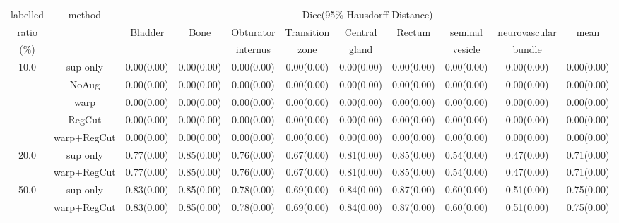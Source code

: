 \begin{table}%
\begin{tabular}{c|c|ccccccccc}%
\hline%
labelled&\multirow{3}{*}{method}&\multicolumn{9}{c}{Dice(95\% Hausdorff Distance)}\\%
ratio&&\multirow{2}{*}{Bladder}&\multirow{2}{*}{Bone}&Obturator&Transition&Central&\multirow{2}{*}{Rectum}&seminal&neurovascular&\multirow{2}{*}{mean}\\%
(\%)&&&&internus&zone&gland&&vesicle&bundle&\\%
\hline%
\multirow{5}{*}{10.0}&sup only&0.00(0.00)&0.00(0.00)&0.00(0.00)&0.00(0.00)&0.00(0.00)&0.00(0.00)&0.00(0.00)&0.00(0.00)&0.00(0.00)\\%
&NoAug&0.00(0.00)&0.00(0.00)&0.00(0.00)&0.00(0.00)&0.00(0.00)&0.00(0.00)&0.00(0.00)&0.00(0.00)&0.00(0.00)\\%
&warp&0.00(0.00)&0.00(0.00)&0.00(0.00)&0.00(0.00)&0.00(0.00)&0.00(0.00)&0.00(0.00)&0.00(0.00)&0.00(0.00)\\%
&RegCut&0.00(0.00)&0.00(0.00)&0.00(0.00)&0.00(0.00)&0.00(0.00)&0.00(0.00)&0.00(0.00)&0.00(0.00)&0.00(0.00)\\%
&warp+RegCut&0.00(0.00)&0.00(0.00)&0.00(0.00)&0.00(0.00)&0.00(0.00)&0.00(0.00)&0.00(0.00)&0.00(0.00)&0.00(0.00)\\%
\hline%
\multirow{2}{*}{20.0}&sup only&0.77(0.00)&0.85(0.00)&0.76(0.00)&0.67(0.00)&0.81(0.00)&0.85(0.00)&0.54(0.00)&0.47(0.00)&0.71(0.00)\\%
&warp+RegCut&0.77(0.00)&0.85(0.00)&0.76(0.00)&0.67(0.00)&0.81(0.00)&0.85(0.00)&0.54(0.00)&0.47(0.00)&0.71(0.00)\\%
\hline%
\multirow{2}{*}{50.0}&sup only&0.83(0.00)&0.85(0.00)&0.78(0.00)&0.69(0.00)&0.84(0.00)&0.87(0.00)&0.60(0.00)&0.51(0.00)&0.75(0.00)\\%
&warp+RegCut&0.83(0.00)&0.85(0.00)&0.78(0.00)&0.69(0.00)&0.84(0.00)&0.87(0.00)&0.60(0.00)&0.51(0.00)&0.75(0.00)\\%
\hline%
\end{tabular}%
\end{table}